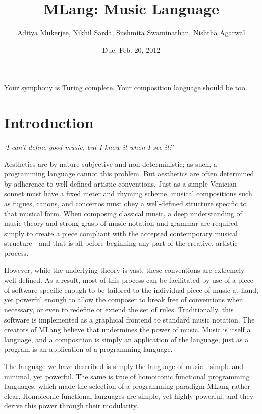 \documentclass{article}
\title{MLang: Music Language}
\author{Aditya Mukerjee, Nikhil Sarda, Sushmita Swaminathan, Nishtha Agarwal}
\date{Due: Feb. 20, 2012}
\begin{document}
 
\maketitle 


Your symphony is Turing complete. Your composition language should be too.


\section{Introduction}


\emph{‘I can’t define good music, but I know it when I see it!’}\newline



Aesthetics are by nature subjective and non-deterministic; as such, a programming language cannot this problem. But aesthetics are often determined by adherence to well-defined artistic conventions. Just as a simple Venician sonnet must have a fixed meter and rhyming scheme, musical compositions such as fugues, canons, and concertos must obey a well-defined structure specific to that musical form. When composing classical music, a deep understanding of music theory and strong grasp of music notation and grammar are required simply to create a piece compliant with the accepted contemporary musical structure - and that is all before beginning any part of the creative, artistic process. 

However, while the underlying theory is vast, these conventions are extremely well-defined. As a result, most of this process can be facilitated by use of a piece of software specific enough to be tailored to the individual piece of music at hand, yet powerful enough to allow the composer to break free of conventions when necessary, or even to redefine or extend the set of rules. Traditionally, this software is implemented as a graphical frontend to standard music notation. The creators of MLang believe that undermines the power of music. Music is itself a language, and a composition is simply an application of the language, just as a program is an application of a programming language.


The language we have described is simply the language of music - simple and minimal, yet powerful. The same is true of homoiconic functional programming languages, which made the selection of a programming paradigm MLang rather clear. Homoiconic functional languages are simple, yet highly powerful, and they derive this power through their modularity.
\end{document}
